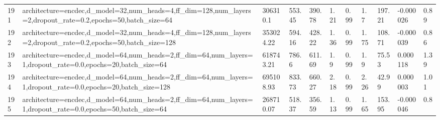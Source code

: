 \begin{longtable}{C{0.8cm} L{2cm} C{1.15cm} C{1.15cm} C{1.15cm} C{1.15cm} C{0.85cm} C{1.25cm} C{1.2cm} C{1.5cm} C{1.0cm}}
191 & architecture=encdec,\newline d\_model=32,\newline num\_heads=4,\newline ff\_dim=128,\newline num\_layers=2,\newline dropout\_rate=0.2,\newline epochs=50,\newline batch\_size=64 & 306310.1 & 553.45 & 390.78 & 1.21 & 0.99 & 1.7 & 197.21 & -0.000026 & 0.89 \\
192 & architecture=encdec,\newline d\_model=32,\newline num\_heads=4,\newline ff\_dim=128,\newline num\_layers=2,\newline dropout\_rate=0.2,\newline epochs=50,\newline batch\_size=128 & 353024.22 & 594.16 & 428.22 & 1.36 & 0.99 & 1.75 & 108.71 & -0.000039 & 0.86 \\
193 & architecture=encdec,\newline d\_model=64,\newline num\_heads=2,\newline ff\_dim=64,\newline num\_layers=1,\newline dropout\_rate=0.0,\newline epochs=20,\newline batch\_size=64 & 618743.21 & 786.6 & 611.69 & 1.9 & 0.99 & 1.9 & 75.53 & 0.000118 & 1.39 \\
194 & architecture=encdec,\newline d\_model=64,\newline num\_heads=2,\newline ff\_dim=64,\newline num\_layers=1,\newline dropout\_rate=0.0,\newline epochs=20,\newline batch\_size=128 & 695108.93 & 833.73 & 660.27 & 2.18 & 0.99 & 2.26 & 42.99 & 0.000003 & 1.01 \\
195 & architecture=encdec,\newline d\_model=64,\newline num\_heads=2,\newline ff\_dim=64,\newline num\_layers=1,\newline dropout\_rate=0.0,\newline epochs=50,\newline batch\_size=64 & 268710.07 & 518.37 & 356.59 & 1.13 & 0.99 & 1.65 & 153.95 & -0.000046 & 0.8 \\

\end{longtable}
